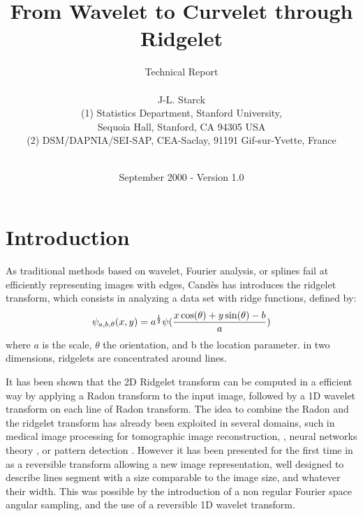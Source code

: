 \documentclass[11pt,a4paper]{article}
\title{  {\Huge \bf  From Wavelet to Curvelet through Ridgelet \\
              \underline{ \hspace{15cm}} }}
\author{ \huge {Technical Report} \\ 
       \vspace{2cm} \\
        J-L. Starck     \\  [12pt]
(1) Statistics Department, Stanford University, \\ 
Sequoia Hall,  Stanford, CA 94305 USA \\ 
(2) DSM/DAPNIA/SEI-SAP, CEA-Saclay, 91191 Gif-sur-Yvette, France   \\
       \\ 
      \vspace{1cm}}
\date{September 2000 - Version 1.0\\
     \vspace{1cm}}
\begin{document}

\maketitle
\tableofcontents

\newpage


 
 
 

\section{Introduction}
 As traditional methods based on wavelet, Fourier analysis, or splines
fail at efficiently representing images with edges, 
Cand\`es \cite{cur:candes98,cur:candes99_1,cur:candes99_2,cur:candes99_3}
has introduces the ridgelet transform, which
consists in analyzing a data set with ridge functions, defined by:
\begin{eqnarray}
\psi_{a,b,\theta}(x,y) = a^{1 \over 2} \psi(\frac{x \cos(\theta) + y \sin(\theta)-b}{a})
\end{eqnarray}
where $a$ is the scale, $\theta$ the orientation, and b the location parameter.
in two dimensions, ridgelets are concentrated around lines.

 It has been shown  \cite{cur:candes98} that the 2D Ridgelet transform can be
computed in a efficient way by applying a Radon transform to the input
image, followed  by a 1D wavelet transform on each line of Radon transform.
The idea to combine the Radon and the ridgelet transform has already
been exploited in several domains, such in medical image processing
for tomographic image reconstruction, 
\cite{cur:sahiner92,cur:sahiner97,cur:sahiner98,cur:olson94,cur:zhao97}, 
neural networks theory \cite{cur:meir98}, 
or pattern detection \cite{cur:magli97,cur:magli99}. However 
it has been presented for the first time in \cite{cur:candes98} as a
reversible transform allowing a new image representation, well designed  
to describe lines segment with a size comparable to the image size, 
and whatever their width. This was possible by the
introduction of a non regular Fourier space angular sampling, and
the use of a reversible 1D wavelet transform.
\end{document}
